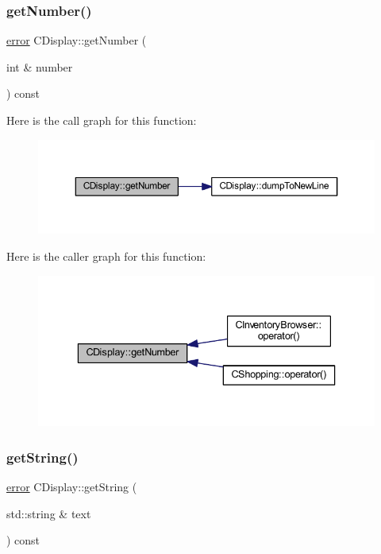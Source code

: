 \subsubsection{\texorpdfstring{get\+Number()}{getNumber()}}
{\footnotesize\ttfamily \mbox{\hyperlink{_errors_list_8h_af10dacfa214e2575bb2e0ee407c242e0}{error}} C\+Display\+::get\+Number (\begin{DoxyParamCaption}\item[{int \&}]{number }\end{DoxyParamCaption}) const}

Here is the call graph for this function\+:\nopagebreak
\begin{figure}[H]
\begin{center}
\leavevmode
\includegraphics[width=350pt]{class_c_display_af552459e3405bb18e1dd879f7fdc9606_cgraph}
\end{center}
\end{figure}
Here is the caller graph for this function\+:\nopagebreak
\begin{figure}[H]
\begin{center}
\leavevmode
\includegraphics[width=336pt]{class_c_display_af552459e3405bb18e1dd879f7fdc9606_icgraph}
\end{center}
\end{figure}
\mbox{\label{class_c_display_a1bd3e25973ed15055a68d4db6abfa765}} 
\subsubsection{\texorpdfstring{get\+String()}{getString()}}
{\footnotesize\ttfamily \mbox{\hyperlink{_errors_list_8h_af10dacfa214e2575bb2e0ee407c242e0}{error}} C\+Display\+::get\+String (\begin{DoxyParamCaption}\item[{std\+::string \&}]{text }\end{DoxyParamCaption}) const}

